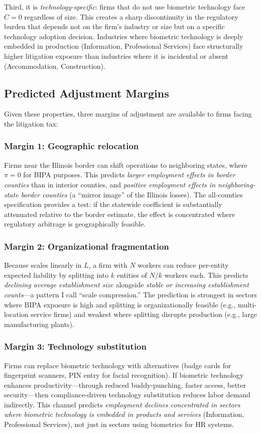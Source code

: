 \documentclass[12pt]{article}
\begin{document}
Third, it is \textit{technology-specific}: firms that do not use biometric technology face $C = 0$ regardless of size. This creates a sharp discontinuity in the regulatory burden that depends not on the firm's industry or size but on a specific technology adoption decision. Industries where biometric technology is deeply embedded in production (Information, Professional Services) face structurally higher litigation exposure than industries where it is incidental or absent (Accommodation, Construction).

\subsection{Predicted Adjustment Margins}

Given these properties, three margins of adjustment are available to firms facing the litigation tax:

\subsubsection*{Margin 1: Geographic relocation} Firms near the Illinois border can shift operations to neighboring states, where $\pi = 0$ for BIPA purposes. This predicts \textit{larger employment effects in border counties} than in interior counties, and \textit{positive employment effects in neighboring-state border counties} (a ``mirror image'' of the Illinois losses). The all-counties specification provides a test: if the statewide coefficient is substantially attenuated relative to the border estimate, the effect is concentrated where regulatory arbitrage is geographically feasible.

\subsubsection*{Margin 2: Organizational fragmentation} Because  scales linearly in $L$, a firm with $N$ workers can reduce per-entity expected liability by splitting into $k$ entities of $N/k$ workers each. This predicts \textit{declining average establishment size} alongside \textit{stable or increasing establishment counts}---a pattern I call ``scale compression.'' The prediction is strongest in sectors where BIPA exposure is high and splitting is organizationally feasible (e.g., multi-location service firms) and weakest where splitting disrupts production (e.g., large manufacturing plants).

\subsubsection*{Margin 3: Technology substitution} Firms can replace biometric technology with alternatives (badge cards for fingerprint scanners, PIN entry for facial recognition). If biometric technology enhances productivity---through reduced buddy-punching, faster access, better security---then compliance-driven technology substitution reduces labor demand indirectly. This channel predicts \textit{employment declines concentrated in sectors where biometric technology is embedded in products and services} (Information, Professional Services), not just in sectors using biometrics for HR systems.
\end{document}
